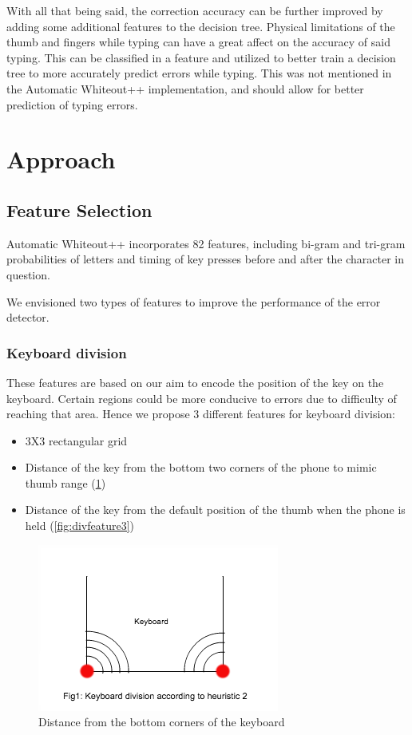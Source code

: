 \documentclass[letterpaper, 10 pt, conference]{ieeeconf}  %
\begin{document}
With all that being said, the correction accuracy can be further improved by adding some additional features to the decision tree.  Physical limitations of the thumb and fingers while typing can have a great affect on the accuracy of said typing.  This can be classified in a feature and utilized to better train a decision tree to more accurately predict errors while typing.  This was not mentioned in the Automatic Whiteout++ implementation, and should allow for better prediction of typing errors.

\section{Approach}

\subsection{Feature Selection}

Automatic Whiteout++ incorporates 82 features, including bi-gram and tri-gram probabilities of letters and timing of key presses before and after the character in question.

We envisioned two types of features to improve the performance of the error detector.

\subsubsection{Keyboard division}

These features are based on our aim to encode the position of the key on the keyboard. Certain regions could be more conducive to errors due to difficulty of reaching that area. Hence we propose 3 different features for keyboard division:
\begin{itemize}
\item 3X3 rectangular grid
\item Distance of the key from the bottom two corners of the phone to mimic thumb range (\ref{fig:divfeature2})
\item Distance of the key from the default position of the thumb when the phone is held (\ref{fig:divfeature3})
\end{itemize}

\begin{figure}[!h]
    \centering
    \includegraphics[scale=0.8]{heuristic2.png}
    \caption{Distance from the bottom corners of the keyboard}
    \label{fig:divfeature2}
\end{figure}
\end{document}
